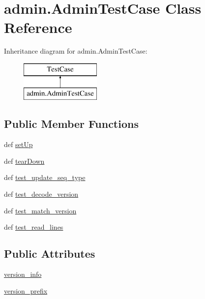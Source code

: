 \hypertarget{classadmin_1_1AdminTestCase}{\section{admin.\-Admin\-Test\-Case Class Reference}
\label{classadmin_1_1AdminTestCase}
}
Inheritance diagram for admin.\-Admin\-Test\-Case\-:\begin{figure}[H]
\begin{center}
\leavevmode
\includegraphics[height=2.000000cm]{de/d4d/classadmin_1_1AdminTestCase}
\end{center}
\end{figure}
\subsection*{Public Member Functions}
\begin{DoxyCompactItemize}
\item 
def \hyperlink{classadmin_1_1AdminTestCase_aca4bb6a593abafd54beab84d0bbdc022}{set\-Up}
\item 
def \hyperlink{classadmin_1_1AdminTestCase_af75fd183f956c48df406d47885d97d7d}{tear\-Down}
\item 
def \hyperlink{classadmin_1_1AdminTestCase_a709452e65fce450953b25bdf40fcc732}{test\-\_\-update\-\_\-seq\-\_\-type}
\item 
def \hyperlink{classadmin_1_1AdminTestCase_a85c52730e0f3491e3b2866404859c6e3}{test\-\_\-decode\-\_\-version}
\item 
def \hyperlink{classadmin_1_1AdminTestCase_a7b416cbb45f1f3a5caaa786979ad0e30}{test\-\_\-match\-\_\-version}
\item 
def \hyperlink{classadmin_1_1AdminTestCase_aeec54ed9163aff1e0615764d4ff2f319}{test\-\_\-read\-\_\-lines}
\end{DoxyCompactItemize}
\subsection*{Public Attributes}
\begin{DoxyCompactItemize}
\item 
\hyperlink{classadmin_1_1AdminTestCase_a235ad774d40bba3600cf09b79dc9f209}{version\-\_\-info}
\item 
\hyperlink{classadmin_1_1AdminTestCase_a6b12aab33be61651698f4b8810678168}{version\-\_\-prefix}
\end{DoxyCompactItemize}


